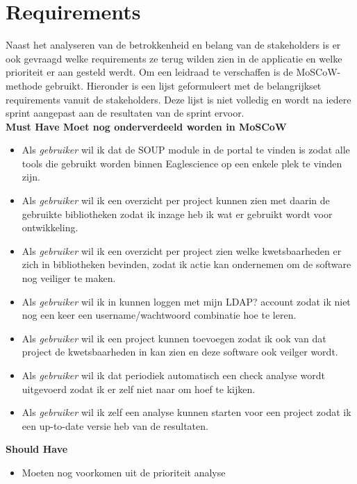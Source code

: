 \section{Requirements}
Naast het analyseren van de betrokkenheid en belang van de stakeholders is er ook gevraagd welke requirements ze terug wilden zien in de applicatie en welke prioriteit er aan gesteld werdt. Om een leidraad te verschaffen is de MoSCoW-methode gebruikt. Hieronder is een lijst geformuleert met de belangrijkset requirements vanuit de stakeholders. Deze lijst is niet volledig en wordt na iedere sprint aangepast aan de resultaten van de sprint ervoor.\\

\textbf{Must Have Moet nog onderverdeeld worden in MoSCoW}
\begin{itemize}
  \item Als \textit{gebruiker} wil ik dat de SOUP module in de portal te vinden is zodat alle tools die gebruikt worden binnen Eaglescience op een enkele plek te vinden zijn.
  \item Als \textit{gebruiker} wil ik een overzicht per project kunnen zien met daarin de gebruikte bibliotheken zodat ik inzage heb ik wat er gebruikt wordt voor ontwikkeling.
  \item Als \textit{gebruiker} wil ik een overzicht per project zien welke kwetsbaarheden er zich in bibliotheken bevinden, zodat ik actie kan ondernemen om de software nog veiliger te maken.
  \item Als \textit{gebruiker} wil ik in kunnen loggen met mijn LDAP? account zodat ik niet nog een keer een username/wachtwoord combinatie hoe te leren.
  \item Als \textit{gebruiker} wil ik een project kunnen toevoegen zodat ik ook van dat project de kwetsbaarheden in kan zien en deze software ook veilger wordt.
  \item Als \textit{gebruiker} wil ik dat periodiek automatisch een check analyse wordt uitgevoerd zodat ik er zelf niet naar om hoef te kijken.
  \item Als \textit{gebruiker} wil ik zelf een analyse kunnen starten voor een project zodat ik een up-to-date versie heb van de resultaten.

\end{itemize}

\textbf{Should Have}
\begin{itemize}
  \item Moeten nog voorkomen uit de prioriteit analyse
\end{itemize}


